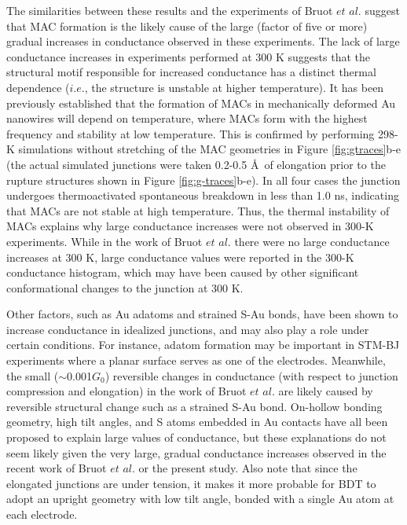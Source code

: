 \documentclass[10pt]{report}  %
\newcommand\findent{\hspace*{\parindent}}
\begin{document}
\findent The similarities between these results and the experiments of Bruot $et$ $al.$ \cite{Bruot:2012} suggest that MAC formation is the likely cause of the large (factor of five or more) gradual increases in conductance observed in these experiments. The lack of large conductance increases in experiments performed at 300 K \cite{Bruot:2012} suggests that the structural motif responsible for increased conductance has a distinct thermal dependence ($i.e.$, the structure is unstable at higher temperature). It has been previously \cite{Pu:2008} established that the formation of MACs in mechanically deformed Au nanowires will depend on temperature, where MACs form with the highest frequency and stability at low temperature. This is confirmed by performing 298-K simulations without stretching of the MAC geometries in Figure \ref{fig:gtraces}b-e (the actual simulated junctions were taken 0.2-0.5 \AA\ of elongation prior to the rupture structures shown in Figure \ref{fig:g-traces}b-e). In all four cases the junction undergoes thermoactivated spontaneous breakdown in less than 1.0 ns, indicating that MACs are not stable at high temperature. Thus, the thermal instability of MACs explains why large conductance increases were not observed in 300-K experiments.\cite{Bruot:2012} While in the work of Bruot $et$ $al.$ \cite{Bruot:2012} there were no large conductance increases at 300 K, large conductance values were reported in the 300-K conductance histogram, which may have been caused by other significant conformational changes to the junction at 300 K.   

Other factors, such as Au adatoms and strained S-Au bonds, have been shown \cite{Pontes:2011,Sergueev:2010,Romaner:2006,Hoft:2006} to increase conductance in idealized junctions, and may also play a role under certain conditions. For instance, adatom formation may be important in STM-BJ experiments \cite{Xiao:2004} where a planar surface serves as one of the electrodes. Meanwhile, the small ($\sim$0.001$G_{0}$) reversible  changes in conductance (with respect to junction compression and elongation) in the work of Bruot $et$ $al.$ \cite{Bruot:2012} are likely caused by reversible structural change such as a strained S-Au bond. On-hollow bonding geometry, \cite{Tsutsui:2006,Kim:2011} high tilt angles, \cite{Haiss:2008,Kim:2011} and S atoms embedded in Au contacts \cite{Arroyo:2011} have all been proposed to explain large values of conductance, but these explanations do not seem likely given the very large, gradual conductance increases observed in the recent work of Bruot $et$ $al.$ \cite{Bruot:2012} or the present study.  Also note that since the elongated junctions are under tension, it makes it more probable for BDT to adopt an upright geometry with low tilt angle, bonded with a single Au atom at each electrode.   
\end{document}

